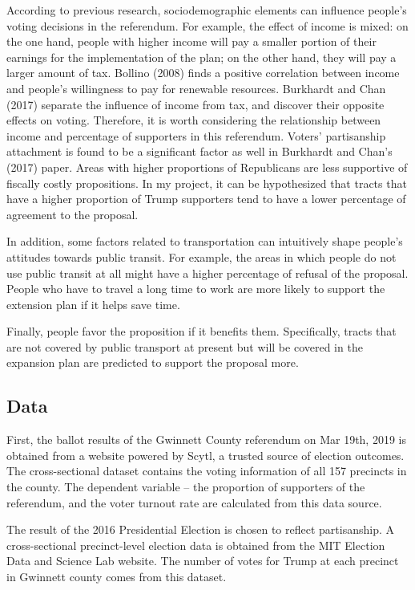 \documentclass[
]{article}
\begin{document}
According to previous research, sociodemographic elements can influence
people's voting decisions in the referendum. For example, the effect of
income is mixed: on the one hand, people with higher income will pay a
smaller portion of their earnings for the implementation of the plan; on
the other hand, they will pay a larger amount of tax. Bollino (2008)
finds a positive correlation between income and people's willingness to
pay for renewable resources. Burkhardt and Chan (2017) separate the
influence of income from tax, and discover their opposite effects on
voting. Therefore, it is worth considering the relationship between
income and percentage of supporters in this referendum. Voters'
partisanship attachment is found to be a significant factor as well in
Burkhardt and Chan's (2017) paper. Areas with higher proportions of
Republicans are less supportive of fiscally costly propositions. In my
project, it can be hypothesized that tracts that have a higher
proportion of Trump supporters tend to have a lower percentage of
agreement to the proposal.

In addition, some factors related to transportation can intuitively
shape people's attitudes towards public transit. For example, the areas
in which people do not use public transit at all might have a higher
percentage of refusal of the proposal. People who have to travel a long
time to work are more likely to support the extension plan if it helps
save time.

Finally, people favor the proposition if it benefits them. Specifically,
tracts that are not covered by public transport at present but will be
covered in the expansion plan are predicted to support the proposal
more.

\hypertarget{data}{%
\subsection{Data}\label{data}}

First, the ballot results of the Gwinnett County referendum on Mar 19th,
2019 is obtained from a website powered by Scytl, a trusted source of
election outcomes. The cross-sectional dataset contains the voting
information of all 157 precincts in the county. The dependent variable
-- the proportion of supporters of the referendum, and the voter turnout
rate are calculated from this data source.

The result of the 2016 Presidential Election is chosen to reflect
partisanship. A cross-sectional precinct-level election data is obtained
from the MIT Election Data and Science Lab website. The number of votes
for Trump at each precinct in Gwinnett county comes from this dataset.
\end{document}
